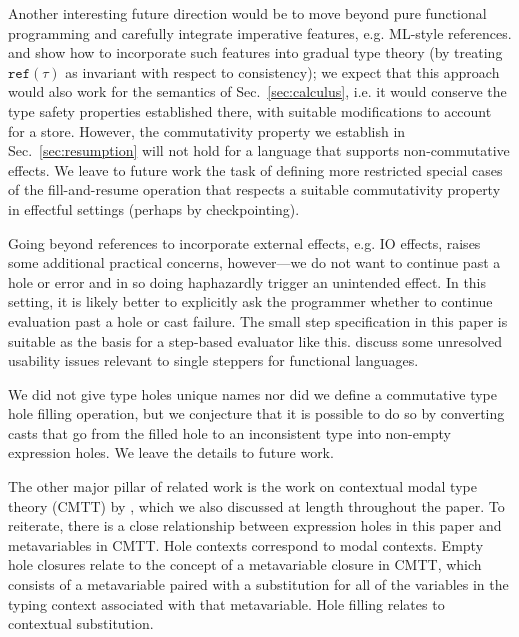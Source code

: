 %
Another interesting future direction would be to move beyond
pure functional programming and carefully integrate imperative features, e.g. ML-style references.
%
%
\citet{Siek06a} and \citet{DBLP:conf/esop/SiekVCTG15} show how to incorporate such features into gradual type theory (by treating $\mathtt{ref}(\tau)$ as invariant with respect to consistency); we expect that this approach would also work for the semantics of Sec.~\ref{sec:calculus}, i.e. it would conserve the type safety properties established there, with suitable modifications to account for a store. However, the commutativity property we establish in Sec.~\ref{sec:resumption} will not hold for a language that supports non-commutative effects. We leave to future work the task of defining more restricted special cases of the fill-and-resume operation that respects a suitable commutativity property in effectful settings (perhaps by checkpointing).

%
Going beyond references to incorporate external effects, e.g. IO effects, raises some additional practical concerns, however---we do not want to continue past a hole or error and in so doing haphazardly trigger an unintended effect. In this setting, it is likely better to explicitly ask the programmer whether to continue evaluation past a hole or cast failure. The small step specification in this paper is suitable as the basis for a  step-based evaluator like this. \citet{ocaml-stepper} discuss some unresolved usability issues relevant to single steppers for functional languages. 

We did not give type holes unique names nor did we define a commutative type hole filling operation, but we conjecture that it is possible to do so by converting casts that go from the filled hole to an inconsistent type into non-empty expression holes. We leave the details to future work. 



The other major pillar of related work is the work on contextual modal type theory (CMTT) by \citet{Nanevski2008}, which we also discussed at length throughout the paper. To reiterate, there is a close relationship between expression holes in this paper and metavariables in CMTT. Hole contexts correspond to modal contexts.
Empty hole closures 
relate to the concept of a {metavariable closure} in CMTT, which consists
of a metavariable paired with a substitution for all of the variables in the
typing context associated with that metavariable. Hole filling relates to contextual substitution. 

